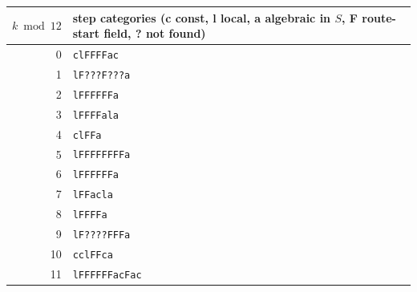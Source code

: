 \begin{tabular}{@{}rl@{}}\toprule $k\bmod 12$ & step categories (c const, l local, a algebraic in $S$, F route-start field, ? not found)\\\midrule
0 & \texttt{clFFFFac}\\
1 & \texttt{lF???F???a}\\
2 & \texttt{lFFFFFFa}\\
3 & \texttt{lFFFFala}\\
4 & \texttt{clFFa}\\
5 & \texttt{lFFFFFFFFa}\\
6 & \texttt{lFFFFFFa}\\
7 & \texttt{lFFacla}\\
8 & \texttt{lFFFFa}\\
9 & \texttt{lF????FFFa}\\
10 & \texttt{cclFFca}\\
11 & \texttt{lFFFFFFacFac}\\
\bottomrule\end{tabular}

